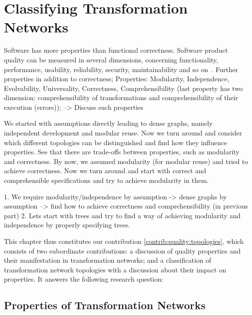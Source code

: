\chapter{Classifying Transformation Networks
}
\label{chap:properties}

Software has more properties than functional correctness.
Software product quality can be measured in several dimensions, concerning functionality, performance, usability, reliability, security, maintainability and so on~\cite{iso25010}.
Further properties in addition to correctness;
Properties: Modularity, Independence, Evolvability, Universality, Correctness, Comprehensibility (last property has two dimension: comprehensibility of transformations and comprehensibility of their execution (errors));
--> Discuss such properties

We started with assumptions directly leading to dense graphs, namely independent development and modular reuse.
Now we turn around and consider which different topologies can be distinguished and find how they influence properties. 
See that there are trade-offs between properties, such as modularity and correctness.
By now, we assumed modularity (for modular reuse) and tried to achieve correctness. Now we turn around and start with correct and comprehensible specifications and try to achieve modularity in them.

1. We require modularity/independence by assumption -> dense graphs by assumption --> find how to achieve correctness and comprehensibility (in previous part)
2. Lets start with trees and try to find a way of achieving modularity and independence by properly specifying trees.


This chapter thus constitutes our contribution \autoref{contrib:quality:topologies}, which consists of two subordinate contributions: a discussion of quality properties and their manifestation in transformation networks; and a classification of transformation network topologies with a discussion about their impact on properties.
It answers the following research question:




\section{Properties of Transformation Networks}

